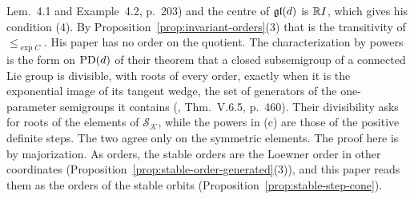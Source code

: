 Lem.~4.1 and Example~4.2, p.~203) and the centre of $\mathfrak{gl}(d)$ is $\mathbb{R} I$, which gives his condition (4). By
Proposition~\ref{prop:invariant-orders}(3) that is the transitivity of $\le_{\exp C}$. His paper has no order on the quotient. The characterization by powers is the
form on $\mathrm{PD}(d)$ of their theorem that a closed subsemigroup of a connected Lie group is divisible,
with roots of every order, exactly when it is the exponential image of its tangent wedge, the
set of generators of the one-parameter semigroups it contains
(, Thm.~V.6.5, p.~460). Their divisibility asks for roots of the elements of
$\mathcal S_{\mathcal K}$, while the powers in (c) are those of the positive definite steps. The two agree
only on the symmetric elements. The proof here is by majorization. As orders, the stable
orders are the Loewner order in other coordinates (Proposition~\ref{prop:stable-order-generated}(3)), and
this paper reads them as the orders of the stable orbits (Proposition~\ref{prop:stable-step-cone}).
